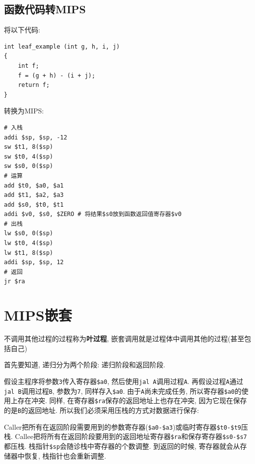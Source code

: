 \subsection{函数代码转MIPS}
将以下代码:
\begin{lstlisting}
int leaf_example (int g, h, i, j)
{
    int f;
    f = (g + h) - (i + j);
    return f;
}
\end{lstlisting}\par
转换为MIPS:
\begin{lstlisting}
# 入栈
addi $sp, $sp, -12
sw $t1, 8($sp)
sw $t0, 4($sp)
sw $s0, 0($sp)
# 运算
add $t0, $a0, $a1
add $t1, $a2, $a3
add $s0, $t0, $t1
addi $v0, $s0, $ZERO # 将结果$s0放到函数返回值寄存器$v0
# 出栈
lw $s0, 0($sp)
lw $t0, 4($sp)
lw $t1, 8($sp)
addi $sp, $sp, 12
# 返回
jr $ra
\end{lstlisting}
\section{MIPS嵌套}
不调用其他过程的过程称为\textbf{叶过程}, 嵌套调用就是过程体中调用其他的过程(甚至包括自己) \par
首先要知道, 递归分为两个阶段: 递归阶段和返回阶段. \par
假设主程序将参数\verb|3|传入寄存器\verb|$a0|, 然后使用\verb|jal A|调用过程\verb|A|. 再假设过程\verb|A|通过\verb|jal B|调用过程\verb|B|, 参数为\verb|7|, 同样存入\verb|$a0|. 由于\verb|A|尚未完成任务, 所以寄存器\verb|$a0|的使用上存在冲突. 同样, 在寄存器\verb|$ra|保存的返回地址上也存在冲突, 因为它现在保存的是\verb|B|的返回地址. 所以我们必须采用压栈的方式对数据进行保存: \par
Caller把所有在返回阶段需要用到的参数寄存器(\verb|$a0-$a3|)或临时寄存器\verb|$t0-$t9|压栈. Callee把将所有在返回阶段要用到的返回地址寄存器\verb|$ra|和保存寄存器\verb|$s0-$s7|都压栈. 栈指针\verb|$sp|会随诊栈中寄存器的个数调整. 到返回的时候, 寄存器就会从存储器中恢复, 栈指针也会重新调整.
